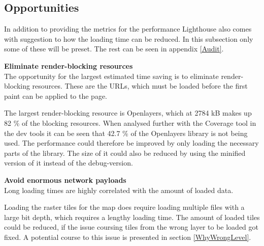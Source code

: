 \subsection{Opportunities}
In addition to providing the metrics for the performance Lighthouse also comes with suggestion to how the loading time can be reduced. In this subsection only some of these will be preset. The rest can be seen in appendix \ref{Audit}.

\textbf{Eliminate render-blocking resources}\\
The opportunity for the largest estimated time saving is to eliminate render-blocking resources. These are the URLs, which must be loaded before the first paint can be applied to the page. \citep{RenderBlocking}

The largest render-blocking resource is Openlayers, which at 2784 kB makes up 82 \% of the blocking resources. When analysed further with the Coverage tool in the dev tools it can be seen that 42.7 \% of the Openlayers library is not being used. The performance could therefore be improved by only loading the necessary parts of the library. The size of it could also be reduced by using the minified version of it instead of the debug-version.


 


 

%
%

\textbf{Avoid enormous network payloads}\\
Long loading times are highly correlated with the amount of loaded data.  
\citep{LoadingTooMuch}

Loading the raster tiles for the map does require loading multiple files with a large bit depth, which requires a lengthy loading time. The amount of loaded tiles could be reduced, if the issue coursing tiles from the wrong layer to be loaded got fixed. A potential course to this issue is presented in section \ref{WhyWrongLevel}.

